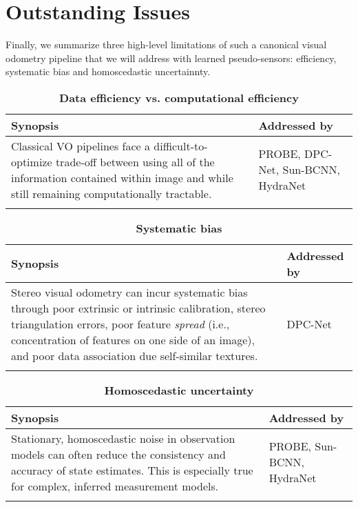 \section{Outstanding Issues}
Finally, we summarize three high-level limitations of such a canonical visual odometry pipeline that we will address with learned pseudo-sensors: efficiency, systematic bias and homoscedastic uncertainnty.

\begin{table}[h!]
	\caption{\textbf{Data efficiency vs. computational efficiency}}	\begin{threeparttable}
	\begin{tabular}{m{}m{}}
		\toprule
		\textbf{Synopsis} & \textbf{Addressed by} \\ \midrule  
		Classical VO pipelines face a difficult-to-optimize trade-off between using all of the information contained within image and while still remaining computationally tractable.  & PROBE, DPC-Net, Sun-BCNN, HydraNet \\
		& \\
		\bottomrule
	\end{tabular}
\end{threeparttable}
\end{table}


\begin{table}[h!]
	\caption{\textbf{Systematic bias}}
	\begin{threeparttable}
	\begin{tabular}{m{}m{}}
		\toprule
		\textbf{Synopsis} & \textbf{Addressed by} \\ \midrule  
		Stereo visual odometry can incur systematic bias through poor extrinsic or intrinsic calibration, stereo triangulation errors, poor feature \textit{spread} (i.e., concentration of features on one side of an image), and poor data association due self-similar textures. &  DPC-Net \\
		& \\
		\bottomrule
	\end{tabular}
\end{threeparttable}
\end{table}


\begin{table}[h!]
	\caption{\textbf{Homoscedastic uncertainty}}
	\begin{threeparttable}
	\begin{tabular}{m{}m{}}
		\toprule
		\textbf{Synopsis} & \textbf{Addressed by} \\ \midrule  
		Stationary, homoscedastic noise in observation models can often reduce the consistency and accuracy of state estimates. This is especially true for complex, inferred measurement models. &  PROBE, Sun-BCNN, HydraNet \\
		& \\
		\bottomrule
	\end{tabular}
\end{threeparttable}
\end{table}

